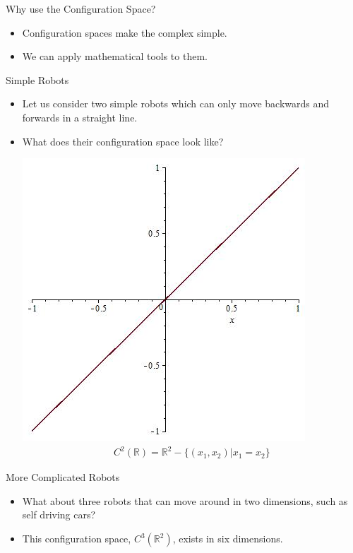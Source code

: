 \documentclass{beamer}
\newcommand{\R}{\mathbb{R}}
\begin{document}
\begin{frame}{Why use the Configuration Space?}
\begin{itemize}
\item Configuration spaces make the complex simple.\pause
\item We can apply mathematical tools to them.
\end{itemize}
\end{frame}


\begin{frame}{Simple Robots}

\begin{itemize}
\item Let us consider two simple robots which can only move backwards and forwards in a straight line.\pause
\item What does their configuration space look like? \pause

\centering
\includegraphics[scale=.25]{xygraph.jpg}
\begin{align*}
C^2(\mathbb{R})=\mathbb{R}^2 - \{(x_1,x_2)|x_1=x_2\}
\end{align*}
\end{itemize}

\end{frame}

\begin{frame}{More Complicated Robots}
\begin{itemize}
\item What about three robots that can move around in two dimensions, such as self driving cars?\pause
\item This configuration space, $C^3(\R^2)$, exists in six dimensions.
\end{itemize}

 
\end{frame}
\end{document}
